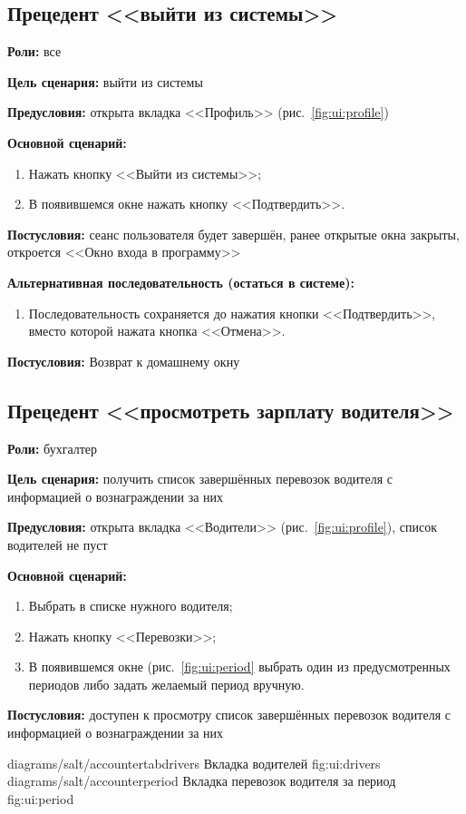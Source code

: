 \subsection{Прецедент <<выйти из системы>>}
\textbf{Роли:} все \par
\textbf{Цель сценария:} выйти из системы \par
\textbf{Предусловия:} открыта вкладка <<Профиль>> 
    (рис.~\ref{fig:ui:profile}) \par
\textbf{Основной сценарий:} 
\begin{enumerate}
    \item Нажать кнопку <<Выйти из системы>>;
    \item В появившемся окне нажать кнопку <<Подтвердить>>.
\end{enumerate} \par
\textbf{Постусловия:} сеанс пользователя будет завершён, 
    ранее открытые окна закрыты, откроется <<Окно входа в программу>> \par
\textbf{Альтернативная последовательность (остаться в системе):} \par
\begin{enumerate}
    \item Последовательность сохраняется до нажатия кнопки <<Подтвердить>>, 
        вместо которой нажата кнопка <<Отмена>>.
\end{enumerate} \par
\textbf{Постусловия:} Возврат к домашнему окну \par

\subsection{Прецедент <<просмотреть зарплату водителя>>}
\textbf{Роли:} бухгалтер \par
\textbf{Цель сценария:} получить список завершённых перевозок водителя 
    с информацией о вознаграждении за них \par
\textbf{Предусловия:} открыта вкладка <<Водители>> 
    (рис.~\ref{fig:ui:profile}), список водителей не пуст \par
\textbf{Основной сценарий:} 
\begin{enumerate}
    \item Выбрать в списке нужного водителя;
    \item Нажать кнопку <<Перевозки>>;
    \item В появившемся окне (рис.~\ref{fig:ui:period} выбрать один из 
    предусмотренных периодов либо задать желаемый период вручную.
\end{enumerate} \par
\textbf{Постусловия:} доступен к просмотру список завершённых 
    перевозок водителя с информацией о вознаграждении за них \par
\image
    {diagrams/salt/accountertabdrivers}
    {Вкладка водителей}
    {fig:ui:drivers}
\image
    {diagrams/salt/accounterperiod}
    {Вкладка перевозок водителя за период}
    {fig:ui:period}


